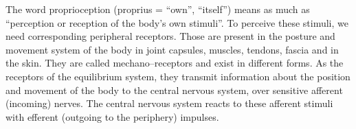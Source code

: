 \documentclass[../main.tex]{subfiles}
\begin{document}
The word  proprioception (proprius = ``own'', ``itself'') means as much as ``{perception} or reception of the {body's own stimuli}''.
To perceive these stimuli, we need corresponding {peripheral receptors}.
Those are present in the posture and movement system of the body in joint capsules, muscles, tendons, fascia and in the skin.
They are called {mechano--receptors} and exist in different forms. 
As the receptors of the equilibrium system, they transmit information about the {position and movement of the body} to the central nervous system, over sensitive afferent (incoming) nerves.
The central nervous system {reacts} to these afferent stimuli with efferent (outgoing to the periphery) impulses.
\end{document}
